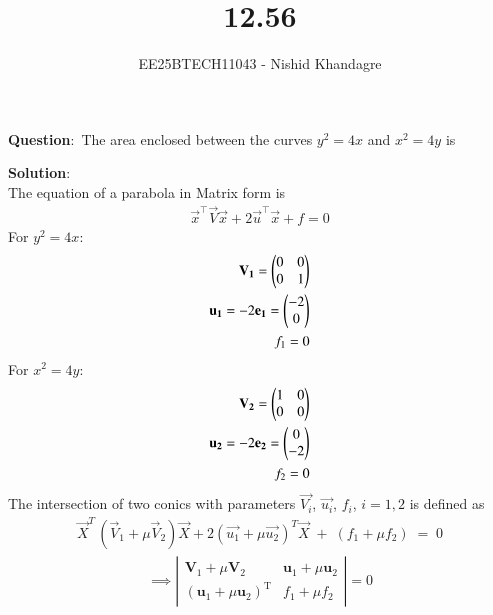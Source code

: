 \documentclass[journal]{IEEEtran}
\title{12.56}
\author{EE25BTECH11043 - Nishid Khandagre}
\begin{document}
\maketitle

\renewcommand{\thefigure}{\theenumi}
\renewcommand{\thetable}{\theenumi}

\textbf{Question}:\
The area enclosed between the curves $y^2 = 4x$ and $x^2 = 4y$ is 

\textbf{Solution}:\\
The equation of a parabola in Matrix form is
\begin{align}
\vec{x}^\top\vec{V}\vec{x} + 2\vec{u}^\top\vec{x} + f = 0
\end{align}
For $y^2 = 4x$:
\begin{align}
    \mathbf{V_1}=\begin{pmatrix}
        0 & 0\\
        0 & 1
    \end{pmatrix}\\
    \mathbf{u_1}=-2\mathbf{e_1}=\begin{pmatrix}-2\\0\end{pmatrix}\\
    f_1=0
\end{align}
For $x^2 = 4y$:
\begin{align}
    \mathbf{V_2}=\begin{pmatrix}
        1 & 0\\
        0 & 0
    \end{pmatrix}\\
    \mathbf{u_2}=-2\mathbf{e_2}=\begin{pmatrix}0\\-2\end{pmatrix}\\
    f_2=0
\end{align}
The intersection of two conics with parameters $\vec{V_i}$, $\vec{u_i}$, $f_i$, $i=1,2$ is defined as 
\begin{align}
\vec{X}^{T}\,(\vec{V}_{1} + \mu \vec{V}_{2})\vec{X} + 2(\vec{u_1} + \mu \vec{u_2})^{T}\vec{X} \;+\; (f_{1} + \mu f_{2}) \;=\; 0 \label{eq:tem}
\end{align}
\begin{align}
\implies \left|
\begin{array}{cc}
\mathbf{V}_1 + \mu \mathbf{V}_2 & \mathbf{u}_1 + \mu \mathbf{u}_2 \\[6pt]
(\mathbf{u}_1 + \mu \mathbf{u}_2)^{\mathrm{T}} & f_1 + \mu f_2
\end{array}
\right| = 0
\end{align}
\end{document}
